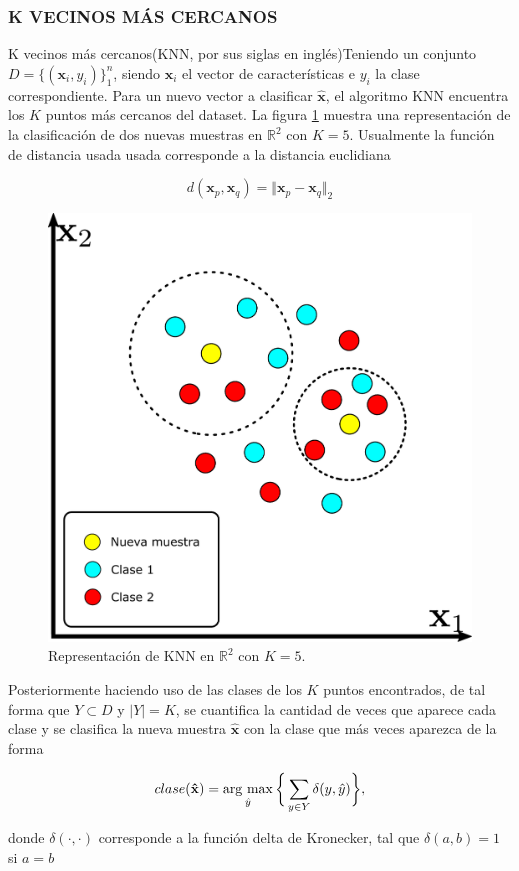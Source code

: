 \subsubsection{K VECINOS MÁS CERCANOS}

K vecinos más cercanos(KNN, por sus siglas en inglés)Teniendo un conjunto $D = \{(\mathbf{x}_i, y_i)\}_1^n$, siendo $\mathbf{x}_i$ el vector de características e $y_i$ la clase correspondiente. Para un nuevo vector a clasificar $\mathbf{\hat{x}}$, el algoritmo KNN encuentra los $K$ puntos más cercanos del dataset. La figura \ref{fig:knn} muestra una representación de la clasificación de dos nuevas muestras en $\mathbb{R}^2$ con $K = 5$. Usualmente la función de distancia usada usada corresponde a la distancia euclidiana

\begin{equation}
    d(\mathbf{x}_p,\mathbf{x}_q) = \Vert \mathbf{x}_p-\mathbf{x}_q \Vert_2
    \label{eq:distancia_euclidiana}
\end{equation}

\begin{figure}[H]
    \centering
    \includegraphics[width=0.4\linewidth]{images/knn.pdf}
    \caption{Representación de KNN en $\mathbb{R}^2$ con $K = 5$.}
    \label{fig:knn}
\end{figure}

Posteriormente haciendo uso de las clases de los $K$ puntos encontrados, de tal forma que $Y \subset D$ y $\vert Y \vert = K$, se cuantifica la cantidad de veces que aparece cada clase y se clasifica la nueva muestra $\mathbf{\hat{x}}$ con la clase que más veces aparezca de la forma

\begin{equation}
    clase(\mathbf{\hat{x}}) =  \operatorname*{arg \ max}_{\hat{y}} \bigg\{ \sum_{y \in Y} \delta(y,\hat{y})\bigg\},
\end{equation}

donde $\delta(\cdot,\cdot)$ corresponde a la función delta de Kronecker, tal que $\delta(a,b) = 1$ si $a=b$


